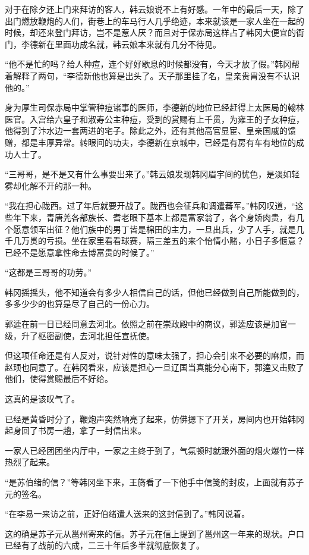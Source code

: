 对于在除夕还上门来拜访的客人，韩云娘说不上有好感。一年中的最后一天，除了出门燃放鞭炮的人们，街巷上的车马行人几乎绝迹，本来就该是一家人坐在一起的时候，却还来登门拜访，岂不是惹人厌？而且对于保赤局这样占了韩冈大便宜的衙门，李德新在里面功成名就，韩云娘本来就有几分不待见。

“他不是忙的吗？给人种痘，连个好好歇息的时候都没有，今天才放了假。”韩冈帮着解释了两句，“李德新他也算是出头了。天子那里挂了名，皇亲贵胄没有不认识他的。”

身为厚生司保赤局中掌管种痘诸事的医师，李德新的地位已经赶得上太医局的翰林医官。入宫给六皇子和淑寿公主种痘，受到的赏赐有上千贯，为雍王的子女种痘，他得到了汴水边一套两进的宅子。除此之外，还有其他高官显宦、皇亲国戚的馈赠，都是丰厚异常。转眼间的功夫，李德新在京城中，已经是有房有车有地位的成功人士了。

“三哥哥，是不是又有什么事要出来了。”韩云娘发现韩冈眉宇间的忧色，是淡如轻雾却化解不开的那一种。

“我在担心陇西。过了年后就要开战了。陇西也会征兵和调遣蕃军。”韩冈叹道，“这些年下来，青唐羌各部族长、耆老眼下基本上都是富家翁了，各个身娇肉贵，有几个愿意领军出征？他们族中的男丁皆是棉田的主力，一旦出兵，少了人手，就是几千几万贯的亏损。坐在家里看看球赛，隔三差五的来个怡情小赌，小日子多惬意？已经不是愿意拿性命去博富贵的时候了。”

“这都是三哥哥的功劳。”

韩冈摇摇头，他不知道会有多少人相信自己的话，但他已经做到自己所能做到的，多多少少的也算是尽了自己的一份心力。

郭逵在前一日已经同意去河北。依照之前在崇政殿中的商议，郭逵应该是加官一级，升了枢密副使，去河北担任宣抚使。

但这项任命还是有人反对，说针对性的意味太强了，担心会引来不必要的麻烦，而赵顼也同意了。在韩冈看来，应该是担心一旦辽国当真能分心南下，郭逵又击败了他们，使得赏赐最后不好给。

这真的是该叹气了。

已经是黄昏时分了，鞭炮声突然响亮了起来，仿佛摁下了开关，房间内也开始韩冈起身回了书房一趟，拿了一封信出来。

一家人已经团团坐内厅中，一家之主终于到了，气氛顿时就跟外面的烟火爆竹一样热烈了起来。

“是苏伯绪的信？”等韩冈坐下来，王旖看了一下他手中信笺的封皮，上面就有苏子元的签名。

“在李易一来访之前，正好伯绪遣人送来的这封信到了。”韩冈说着。

这的确是苏子元从邕州寄来的信。苏子元在信上提到了邕州这一年来的现状。户口已经有了战前的六成，二三十年后多半就彻底恢复了。

